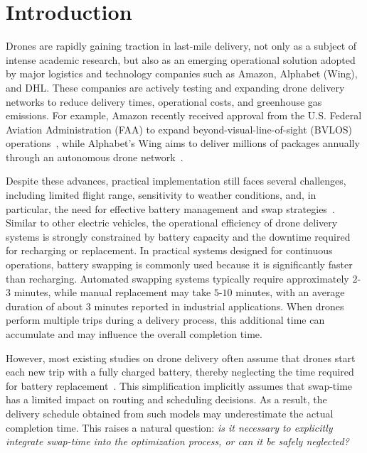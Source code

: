 \documentclass[3p, authoryear, 11pt]{elsarticle}
\begin{document}
\maketitle

\section{Introduction}
\label{sec:intro}

Drones are rapidly gaining traction in last-mile delivery, not only as a subject of intense academic research, but also as an emerging operational solution adopted by major logistics and technology companies such as Amazon, Alphabet (Wing), and DHL. These companies are actively testing and expanding drone delivery networks to reduce delivery times, operational costs, and greenhouse gas emissions.
For example, Amazon recently received approval from the U.S. Federal Aviation Administration (FAA) to expand beyond-visual-line-of-sight (BVLOS) operations~\cite{apnews2024}, while Alphabet’s Wing aims to deliver millions of packages annually through an autonomous drone network~\cite{supplychaindive2023}.

Despite these advances, practical implementation still faces several challenges, including limited flight range, sensitivity to weather conditions, and, in particular, the need for effective battery management and swap strategies~\cite{liu_integrating_2025,vilkki_automatic_2024}. Similar to other electric vehicles, the operational efficiency of drone delivery systems is strongly constrained by battery capacity and the downtime required for recharging or replacement. 
In practical systems designed for continuous operations, battery swapping is commonly used because it is significantly faster than recharging. 
Automated swapping systems typically require approximately $2$-$3$ minutes, while manual replacement may take $5$-$10$ minutes, with an average duration of about $3$ minutes reported in industrial applications. 
When drones perform multiple trips during a delivery process, this additional time can accumulate and may influence the overall completion time.

However, most existing studies on drone delivery often assume that drones start each new trip with a fully charged battery, thereby neglecting the time required for battery replacement~\citep{kong_literature_2026}. This simplification implicitly assumes that swap-time has a limited impact on routing and scheduling decisions. As a result, the delivery schedule obtained from such models may underestimate the actual completion time. This raises a natural question: \textit{is it necessary to explicitly integrate swap-time into the optimization process, or can it be safely neglected?}
\end{document}
